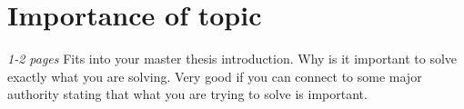\chapter{Importance of topic}
\label{ch:importance}
\textit{1-2 pages}
Fits into your master thesis introduction.
Why is it important to solve exactly what you are solving.
Very good if you can connect to some major authority stating
that what you are trying to solve is important.
